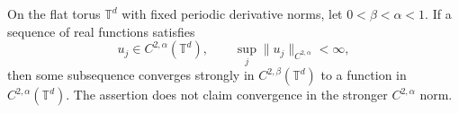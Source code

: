 On the flat torus $\mathbb T^d$ with fixed periodic derivative norms,
let $0<\beta<\alpha<1$. If a sequence of real functions satisfies
\[
 u_j\in C^{2,\alpha}(\mathbb T^d),\qquad
 \sup_j\|u_j\|_{C^{2,\alpha}}<\infty,
\]
then some subsequence converges strongly in $C^{2,\beta}(\mathbb T^d)$
to a function in $C^{2,\alpha}(\mathbb T^d)$.
The assertion does not claim convergence in the stronger $C^{2,\alpha}$ norm.